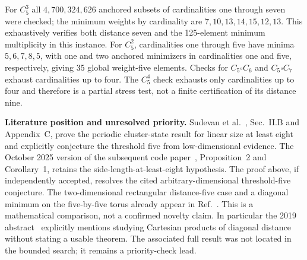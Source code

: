 \documentclass[10pt]{article}
\begin{document}
For $C_5^3$ all $4{,}700{,}324{,}626$ anchored subsets of cardinalities one through seven were checked; the minimum weights by cardinality are $7,10,13,14,15,12,13$. This exhaustively verifies both distance seven and the 125-element minimum multiplicity in this instance. For $C_5^2$, cardinalities one through five have minima $5,6,7,8,5$, with one and two anchored minimizers in cardinalities one and five, respectively, giving 35 global weight-five elements. Checks for $C_5\square C_6$ and $C_5\square C_7$ exhaust cardinalities up to four. The $C_5^4$ check exhausts only cardinalities up to four and therefore is a partial stress test, not a finite certification of its distance nine.

\noindent\textbf{Literature position and unresolved priority.}
Sudevan et al.~\cite{sudevan2023}, Sec.~II.B and Appendix~C, prove the periodic cluster-state result for linear size at least eight and explicitly conjecture the threshold five from low-dimensional evidence. The October 2025 version of the subsequent code paper~\cite{sudevan2025}, Proposition~2 and Corollary~1, retains the side-length-at-least-eight hypothesis. The proof above, if independently accepted, resolves the cited arbitrary-dimensional threshold-five conjecture. The two-dimensional rectangular distance-five case and a diagonal minimum on the five-by-five torus already appear in Ref.~\cite{sudevan2022}. This is a mathematical comparison, not a confirmed novelty claim. In particular the 2019 abstract~\cite{lennen2019} explicitly mentions studying Cartesian products of diagonal distance without stating a usable theorem. The associated full result was not located in the bounded search; it remains a priority-check lead.


\end{document}
